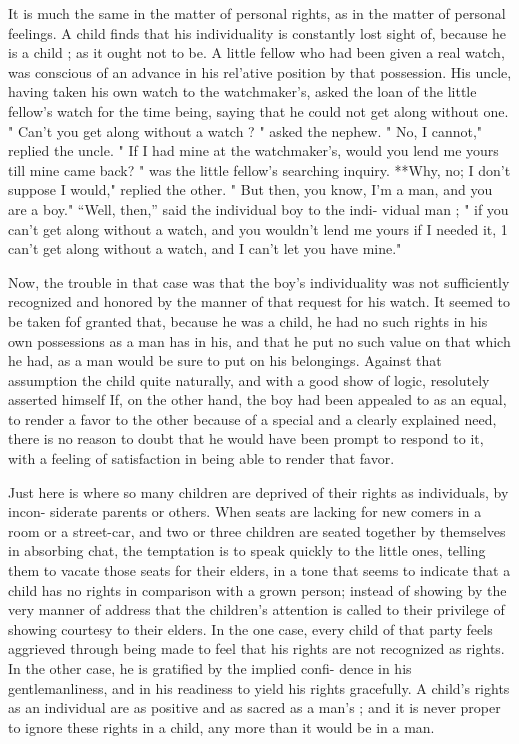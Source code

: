 \documentclass[
]{book}
\begin{document}
It is much the same in the matter of personal rights, as in the matter of personal feelings. A child finds that his individuality is constantly lost sight of, because he is a child ; as it ought not to be. A little fellow who had been given a real watch, was conscious of an advance in his rel'ative position by that possession. His uncle, having taken his own watch to the watchmaker's, asked the loan of the little fellow's watch for the time being, saying that he could not get along without one. " Can't you get along without a watch ? " asked the nephew. " No, I cannot," replied the uncle. " If I had mine at the watchmaker's, would you lend me yours till mine came back? " was the little fellow's searching inquiry. **Why, no; I don't suppose I would," replied the other. " But then, you know, I'm a man, and you are a boy." ``Well, then,'' said the individual boy to the indi- vidual man ; " if you can't get along without a watch, and you wouldn't lend me yours if I needed it, 1 can't get along without a watch, and I can't let you have mine."

Now, the trouble in that case was that the boy's individuality was not sufficiently recognized and honored by the manner of that request for his watch. It seemed to be taken fof granted that, because he was a child, he had no such rights in his own possessions as a man has in his, and that he put no such value on that which he had, as a man would be sure to put on his belongings. Against that assumption the child quite naturally, and with a good show of logic, resolutely asserted himself If, on the other hand, the boy had been appealed to as an equal, to render a favor to the other because of a special and a clearly explained need, there is no reason to doubt that he would have been prompt to respond to it, with a feeling of satisfaction in being able to render that favor.

Just here is where so many children are deprived of their rights as individuals, by incon- siderate parents or others. When seats are lacking for new comers in a room or a street-car, and two or three children are seated together by themselves in absorbing chat, the temptation is to speak quickly to the little ones, telling them to vacate those seats for their elders, in a tone that seems to indicate that a child has no rights in comparison with a grown person; instead of showing by the very manner of address that the children's attention is called to their privilege of showing courtesy to their elders. In the one case, every child of that party feels aggrieved through being made to feel that his rights are not recognized as rights. In the other case, he is gratified by the implied confi- dence in his gentlemanliness, and in his readiness to yield his rights gracefully. A child's rights as an individual are as positive and as sacred as a man's ; and it is never proper to ignore these rights in a child, any more than it would be in a man.
\end{document}

